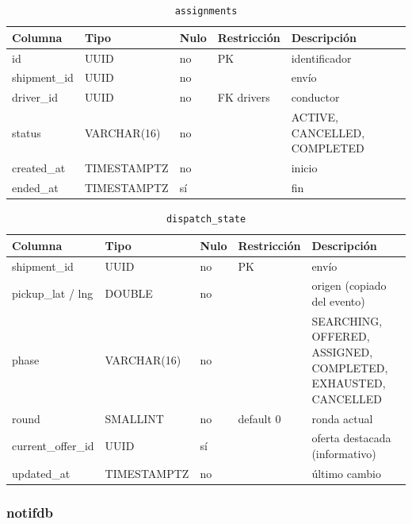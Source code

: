\documentclass[conference]{IEEEtran}
\newcommand{\pkg}[1]{\texttt{#1}}
\begin{document}
\begin{table}[!t]
\centering
\caption{\pkg{assignments}}

\begin{tabular}{@{}L{3.2cm}L{3.2cm}L{1.1cm}L{3.4cm}L{3.9cm}@{}}
\toprule
\textbf{Columna} & \textbf{Tipo} & \textbf{Nulo} & \textbf{Restricción} & \textbf{Descripción}\\
\midrule
id & UUID & no & PK & identificador\\
shipment\_id & UUID & no & & envío\\
driver\_id & UUID & no & FK drivers & conductor\\
status & VARCHAR(16) & no & & ACTIVE, CANCELLED, COMPLETED\\
created\_at & TIMESTAMPTZ & no & & inicio\\
ended\_at & TIMESTAMPTZ & sí & & fin\\
\bottomrule
\end{tabular}
\end{table}

\begin{table}[!t]
\centering
\caption{\pkg{dispatch\_state}}

\begin{tabular}{@{}L{3.2cm}L{3.2cm}L{1.1cm}L{3.4cm}L{3.9cm}@{}}
\toprule
\textbf{Columna} & \textbf{Tipo} & \textbf{Nulo} & \textbf{Restricción} & \textbf{Descripción}\\
\midrule
shipment\_id & UUID & no & PK & envío\\
pickup\_lat / lng & DOUBLE & no & & origen (copiado del evento)\\
phase & VARCHAR(16) & no & & SEARCHING, OFFERED, ASSIGNED, COMPLETED, EXHAUSTED, CANCELLED\\
round & SMALLINT & no & default 0 & ronda actual\\
current\_offer\_id & UUID & sí & & oferta destacada (informativo)\\
updated\_at & TIMESTAMPTZ & no & & último cambio\\
\bottomrule
\end{tabular}
\end{table}

\subsubsection{notifdb}
\end{document}
